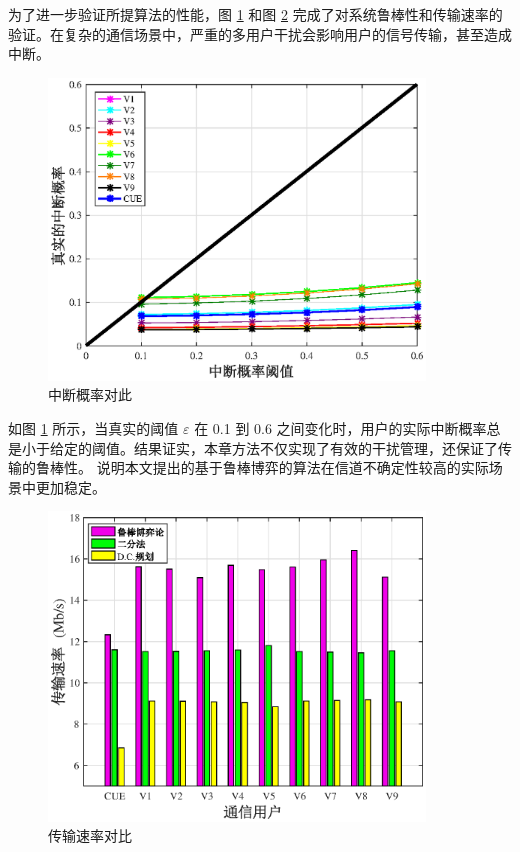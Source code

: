 为了进一步验证所提算法的性能，图 \ref{中断概率对此} 和图 \ref{传输速率对比} 完成了对系统鲁棒性和传输速率的验证。在复杂的通信场景中，严重的多用户干扰会影响用户的信号传输，甚至造成中断。
\begin{figure}[H]
\centering
\includegraphics[width=10cm]{figures//chap2//中断概率.eps}
\caption{中断概率对此}
\label{中断概率对此}
\end{figure}

如图 \ref{中断概率对此} 所示，当真实的阈值 $\varepsilon$ 在 0.1 到 0.6 之间变化时，用户的实际中断概率总是小于给定的阈值。结果证实，本章方法不仅实现了有效的干扰管理，还保证了传输的鲁棒性。
说明本文提出的基于鲁棒博弈的算法在信道不确定性较高的实际场景中更加稳定。
\begin{figure}[H]
\centering
\includegraphics[width=10cm]{figures//chap2//传输速率对比.eps}
\caption{传输速率对比}
\label{传输速率对比}
\end{figure}

